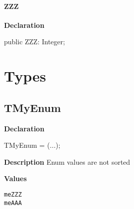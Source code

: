 \documentclass{report}
\begin{document}
\paragraph*{ZZZ}\hspace*{\fill}

\begin{list}{}{
\setlength{\itemindent}{0cm}
\setlength{\listparindent}{0cm}
\setlength{\leftmargin}{\evensidemargin}
\addtolength{\leftmargin}{\tmplength}
\settowidth{\labelsep}{X}
\addtolength{\leftmargin}{\labelsep}
\setlength{\labelwidth}{\tmplength}
}
\begin{flushleft}
\item[\textbf{Declaration}\hfill]
\begin{ttfamily}
public ZZZ: Integer;\end{ttfamily}


\end{flushleft}
\end{list}
\section{Types}
\subsection*{TMyEnum}
\begin{list}{}{
\setlength{\itemindent}{0cm}
\setlength{\listparindent}{0cm}
\setlength{\leftmargin}{\evensidemargin}
\addtolength{\leftmargin}{\tmplength}
\settowidth{\labelsep}{X}
\addtolength{\leftmargin}{\labelsep}
\setlength{\labelwidth}{\tmplength}
}
\begin{flushleft}
\item[\textbf{Declaration}\hfill]
\begin{ttfamily}
TMyEnum = (...);\end{ttfamily}


\end{flushleft}
\par
\item[\textbf{Description}]
Enum values are not sorted\item[\textbf{Values}]
\begin{description}
\item[\texttt{meZZZ}]  
\item[\texttt{meAAA}]  
\end{description}


\end{list}
\end{document}
